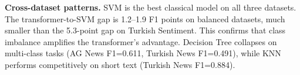 \documentclass[conference]{IEEEtran}
\begin{document}
\textbf{Cross-dataset patterns.} SVM is the best classical model on all three datasets.
The transformer-to-SVM gap is 1.2--1.9 F1 points on balanced datasets, much smaller
than the 5.3-point gap on Turkish Sentiment. This confirms that class imbalance amplifies
the transformer's advantage. Decision Tree collapses on multi-class tasks (AG News
F1=0.611, Turkish News F1=0.491), while KNN performs competitively on short text
(Turkish News F1=0.884).
\end{document}
